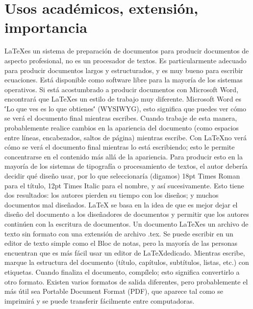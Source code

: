 \documentclass[letterpaper, 10pt, journal]{IEEEtran}
\begin{document}
\section{Usos acad\'emicos, extensi\'on, importancia}
\LaTeX    es un sistema de preparaci\'on de documentos para producir documentos de aspecto profesional, no es un procesador de textos. Es particularmente adecuado para producir documentos largos y estructurados, y es muy bueno para escribir ecuaciones. Est\'a disponible como software libre para la mayor\'ia de los sistemas operativos.
\newline
Si est\'a acostumbrado a producir documentos con Microsoft Word, encontrar\'a que \LaTeX   es un estilo de trabajo muy diferente. Microsoft Word es \''Lo que ves es lo que obtienes\'' (WYSIWYG), esto significa que puedes ver c\'omo se ver\'a el documento final mientras escribes. Cuando trabaje de esta manera, probablemente realice cambios en la apariencia del documento (como espacios entre l\'ineas, encabezados, saltos de p\'agina) mientras escribe. Con \LaTeX   no ver\'a c\'omo se ver\'a el documento final mientras lo est\'a escribiendo; esto le permite concentrarse en el contenido m\'as all\'a de la apariencia.
Para producir esto en la mayor\'ia de los sistemas de tipograf\'ia o procesamiento de textos, el autor deber\'ia decidir qu\'e dise\~no usar, por lo que seleccionar\'ia (digamos) 18pt Times Roman para el t\'itulo, 12pt Times Italic para el nombre, y as\'i sucesivamente. Esto tiene dos resultados: los autores pierden su tiempo con los dise\~nos; y muchos documentos mal dise\~nados. \cite{introductionLatex}
LaTeX se basa en la idea de que es mejor dejar el diseño del documento a los diseñadores de documentos y permitir que los autores continúen con la escritura de documentos. \cite{introductionLatex}
\newline
Un documento \LaTeX   es un archivo de texto sin formato con una extensi\'on de archivo .tex. Se puede escribir en un editor de texto simple como el Bloc de notas, pero la mayor\'ia de las personas encuentran que es m\'as f\'acil usar un editor de \LaTeX   dedicado. Mientras escribe, marque la estructura del documento (t\'itulo, cap\'itulos, subt\'itulos, listas, etc.) con etiquetas. Cuando finaliza el documento, comp\'ilelo; esto significa convertirlo a otro formato. \cite{introductionLatex}
\newline
Existen varios formatos de salida diferentes, pero probablemente el m\'as \'util sea Portable Document Format (PDF), que aparece tal como se imprimir\'a y se puede transferir f\'acilmente entre computadoras. \cite{introductionLatex}
\end{document}
